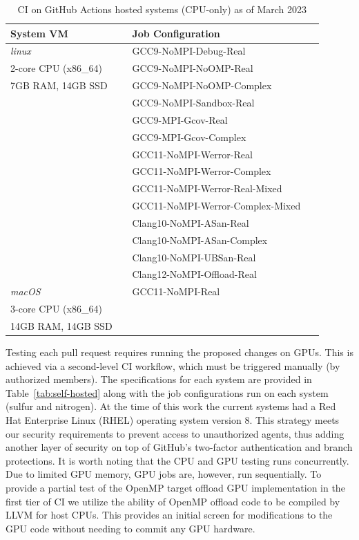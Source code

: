 \begin{table}[!ht]
\centering
\caption{CI on GitHub Actions hosted systems (CPU-only) as of March 2023}
\begin{tabular}{||p{0.35\linewidth} | p{0.55\linewidth}||}
\hline
System VM     & Job Configuration  \\
\hline \hline 
\textit{linux}          & GCC9-NoMPI-Debug-Real         \\
2-core CPU (x86\_64)    & GCC9-NoMPI-NoOMP-Real           \\
7GB RAM, 14GB SSD       & GCC9-NoMPI-NoOMP-Complex        \\
                        & GCC9-NoMPI-Sandbox-Real         \\
                        & GCC9-MPI-Gcov-Real              \\
                        & GCC9-MPI-Gcov-Complex           \\
                        & GCC11-NoMPI-Werror-Real       \\
                        & GCC11-NoMPI-Werror-Complex       \\
                        & GCC11-NoMPI-Werror-Real-Mixed       \\
                        & GCC11-NoMPI-Werror-Complex-Mixed       \\
                        & Clang10-NoMPI-ASan-Real       \\
                        & Clang10-NoMPI-ASan-Complex       \\
                        & Clang10-NoMPI-UBSan-Real      \\
                        & Clang12-NoMPI-Offload-Real       \\
\hline
\textit{macOS}          & GCC11-NoMPI-Real    \\
3-core CPU (x86\_64)    & \\
14GB RAM, 14GB SSD      & \\
\hline
\end{tabular}
\label{tab:GitHubActions}
\end{table}

Testing each pull request requires running the proposed changes on GPUs.
This is achieved via a second-level CI workflow, which must be triggered manually (by authorized members).
The specifications for each system are provided in Table~\ref{tab:self-hosted} along with the job configurations run on each system (sulfur and nitrogen). At the time of this work the current systems had a Red Hat Enterprise Linux (RHEL) operating system version 8.
This strategy meets our security requirements to prevent access to unauthorized agents, thus adding another layer of security on top of GitHub's two-factor authentication and branch
protections.
It is worth noting that the CPU and GPU testing runs concurrently.
Due to limited GPU memory, GPU jobs are, however, run sequentially.
To provide a partial test of the OpenMP target offload GPU implementation  in the first tier of CI we utilize the ability of OpenMP offload code to be compiled by LLVM for host CPUs.
This provides an initial screen for modifications to the GPU code without needing to commit any GPU hardware.

